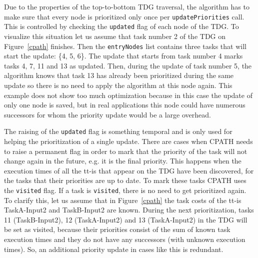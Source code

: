 Due to the properties of the top-to-bottom TDG traversal, the algorithm has to make sure that every node is prioritized only once per \texttt{updatePriorities} call.
This is controlled by checking the \texttt{updated} flag of each node of the TDG.
To visualize this situation let us assume that task number 2 of the TDG on Figure~\ref{cpath} finishes.
Then the \texttt{entryNodes} list contains three tasks that will start the update: \{4, 5, 6\}.
The update that starts from task number 4 marks tasks 4, 7, 11 and 13 as updated.
Then, during the update of task number 5, the algorithm knows that task 13 has already been prioritized during the same update so there is no need to apply the algorithm at this node again.
This example does not show too much optimization because in this case the update of only one node is saved, but in real applications this node could have numerous successors for whom the priority update would be a large overhead.

The raising of the \texttt{updated} flag is something temporal and is only used for helping the prioritization of a single update.
There are cases when CPATH needs to raise a permanent flag in order to mark that the priority of the task will not change again in the future, e.g. it is the final priority.
This happens when the execution times of all the tt-is that appear on the TDG have been discovered, for the tasks that their priorities are up to date.
To mark these tasks CPATH uses the \texttt{visited} flag.
If a task is \texttt{visited}, there is no need to get prioritized again.
To clarify this, let us assume that in Figure~\ref{cpath} the task costs of the tt-is TaskA-Input2 and TaskB-Input2 are known.
During the next prioritization, tasks 11 (TaskB-Input2), 12 (TaskA-Input2) and 13 (TaskA-Input2) in the TDG will be set as visited, because their priorities consist of the sum of known task execution times and they do not have any successors (with unknown execution times).
So, an additional priority update in cases like this is redundant.





